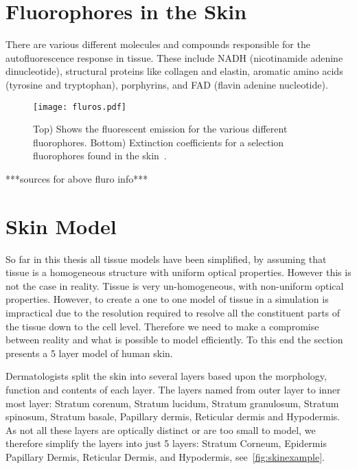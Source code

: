 \section*{Fluorophores in the Skin}

There are various different molecules and compounds responsible for the autofluorescence response in tissue.
These include NADH (nicotinamide adenine dinucleotide), structural proteins like collagen and elastin, aromatic amino acids (tyrosine and tryptophan), porphyrins, and FAD (flavin adenine nucleotide).


\begin{figure}[!htbp]
  \centering
  \texttt{[image: fluros.pdf]}
  \caption{Top) Shows the fluorescent emission for the various different fluorophores. Bottom) Extinction coefficients for a selection fluorophores found in the skin~\cite{prahltyro,prahltryto,soltani2019deep,sun2012biomarkers,islam2013ph,evans2013magnetic,von2012fluorescence}.}
  \label{fig:flurosshow}
\end{figure}

***sources for above fluro info***


\section{Skin Model}

So far in this thesis all tissue models have been simplified, by assuming that tissue is a homogeneous structure with uniform optical properties.
However this is not the case in reality.
Tissue is very un-homogeneous, with non-uniform optical properties.
However, to create a one to one model of tissue in a simulation is impractical due to the resolution required to resolve all the constituent parts of the tissue down to the cell level.
Therefore we need to make a compromise between reality and what is possible to model efficiently.
To this end the section presents a 5 layer model of human skin. 

Dermatologists split the skin into several layers based upon the morphology, function and contents of each layer.
The layers named from outer layer to inner most layer: Stratum corenum, Stratum lucidum, Stratum granulosum, Stratum spinosum, Stratum basale, Papillary dermis, Reticular dermis and Hypodermis.
As not all these layers are optically distinct or are too small to model, we therefore simplify the layers into just 5 layers: Stratum Corneum, Epidermis Papillary Dermis, Reticular Dermis, and Hypodermis, see~\cref{fig:skinexample}.

